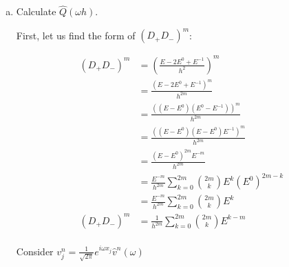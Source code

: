 \documentclass[11pt]{amsart}
\numberwithin{equation}{section}
\begin{document}
\begin{enumerate}[a)]
    \item Calculate $\hat{Q}(\omega h)$.  \\
          
          {\color{blue}
          
          First, let us find the form of $(D_+ D_-)^m$:
          
          \begin{align*}
              (D_+ D_-)^m & = \left(\frac{E - 2E^0 + E^{-1}}{h^2}\right)^m                         \\
                          & = \frac{(E - 2E^0 + E^{-1})^m}{h^{2m}}                                 \\
                          & = \frac{((E - E^0)(E^0 - E^{-1}))^m}{h^{2m}}                           \\
                          & = \frac{((E - E^0)(E - E^0)E^{-1})^m}{h^{2m}}                          \\
                          & = \frac{(E - E^0)^{2m}E^{-m}}{h^{2m}}                                  \\
                          & = \frac{E^{-m}}{h^{2m}} \sum_{k=0}^{2m} \binom{2m}{k} E^k (E^0)^{2m-k} \\
                          & = \frac{E^{-m}}{h^{2m}} \sum_{k=0}^{2m} \binom{2m}{k} E^k              \\
              (D_+ D_-)^m & = \frac{1}{h^{2m}} \sum_{k=0}^{2m} \binom{2m}{k} E^{k-m}               \\
          \end{align*}
          
          Consider $v_j^n = \frac{1}{\sqrt{2\pi}} e^{i\omega x_j} \hat v^n(\omega)$
          
}
\end{enumerate}
\end{document}
